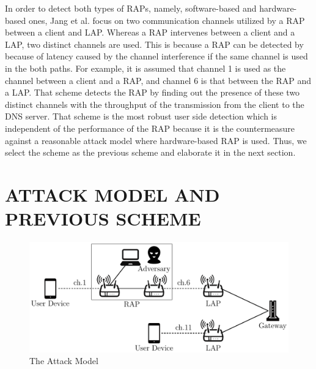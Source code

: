 \documentclass[conference]{IEEEtran}
\begin{document}
In order to detect both types of RAPs, namely, software-based and hardware-based ones, Jang et al. focus on two communication channels utilized by a RAP between a client and LAP\cite{previous}.
Whereas a RAP intervenes between a client and a LAP, two distinct channels are used.
This is because a RAP can be detected by \cite{rtt} because of latency caused by the channel interference if the same channel is used in the both paths.
For example, it is assumed that channel 1 is used as the channel between a client and a RAP, and channel 6 is that between the RAP and a LAP.
That scheme detects the RAP by finding out the presence of these two distinct channels with the throughput of the transmission from the client to the DNS server.
That scheme is the most robust user side detection which is independent of the performance of the RAP because it is the countermeasure against a reasonable attack model where hardware-based RAP is used.
Thus, we select the scheme \cite{previous} as the previous scheme and elaborate it in the next section.

\section{ATTACK MODEL AND PREVIOUS SCHEME}\label{sec:3}
\begin{figure}[t]
    \begin{center}
        \includegraphics[scale=0.5]{attack-model/attack-model.pdf}
        \caption{The Attack Model}
        \label{fig:model}
    \end{center}
\vspace{-2zh}
\end{figure}
\end{document}
